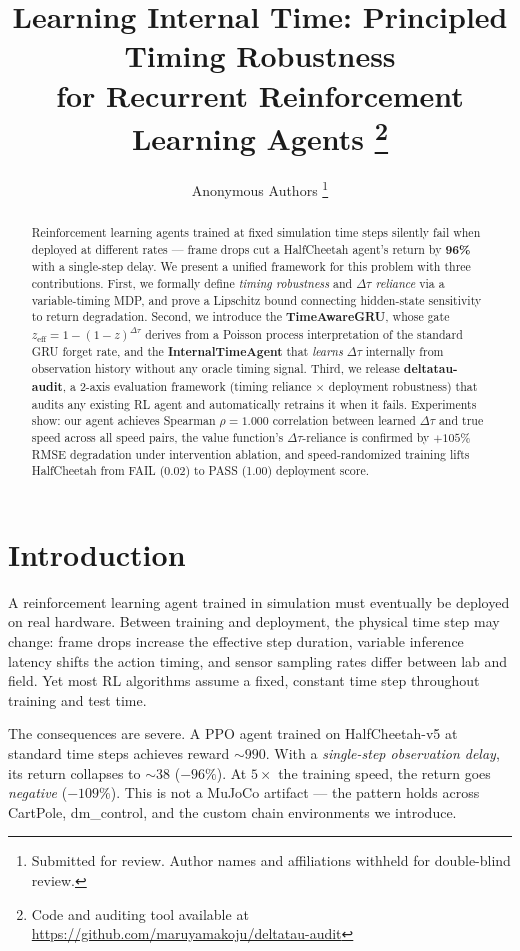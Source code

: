 \documentclass[10pt,twocolumn]{article}
\title{\textbf{Learning Internal Time: Principled Timing Robustness\\
for Recurrent Reinforcement Learning Agents}%
\thanks{Code and auditing tool available at \url{https://github.com/maruyamakoju/deltatau-audit}}}
\author{
  Anonymous Authors%
  \footnote{Submitted for review. Author names and affiliations withheld for double-blind review.}
}
\date{}
\newcommand{\deltatau}{\Delta\tau}
\newcommand{\dteff}{z_\text{eff}}
\theoremstyle{plain}
\theoremstyle{definition}
\begin{document}
\maketitle

\begin{abstract}
Reinforcement learning agents trained at fixed simulation time steps
silently fail when deployed at different rates --- frame drops cut
a HalfCheetah agent's return by \textbf{96\%} with a single-step delay.
We present a unified framework for this problem with three contributions.
First, we formally define \emph{timing robustness} and \emph{$\deltatau$ reliance}
via a variable-timing MDP, and prove a Lipschitz bound connecting hidden-state
sensitivity to return degradation.
Second, we introduce the \textbf{TimeAwareGRU}, whose gate
$\dteff = 1-(1-z)^{\deltatau}$ derives from a Poisson process interpretation
of the standard GRU forget rate, and the \textbf{InternalTimeAgent} that
\emph{learns} $\deltatau$ internally from observation history without any
oracle timing signal.
Third, we release \textbf{deltatau-audit}, a 2-axis evaluation framework
(timing reliance $\times$ deployment robustness) that audits any existing RL
agent and automatically retrains it when it fails.
Experiments show: our agent achieves Spearman $\rho=1.000$ correlation between
learned $\deltatau$ and true speed across all speed pairs,
the value function's $\deltatau$-reliance is confirmed by $+105\%$ RMSE degradation
under intervention ablation, and speed-randomized training lifts HalfCheetah from
FAIL (0.02) to PASS (1.00) deployment score.
\end{abstract}

\section{Introduction}
\label{sec:intro}

A reinforcement learning agent trained in simulation must eventually be deployed on
real hardware. Between training and deployment, the physical time step may change:
frame drops increase the effective step duration, variable inference latency shifts
the action timing, and sensor sampling rates differ between lab and field.
Yet most RL algorithms assume a fixed, constant time step throughout training and
test time.

The consequences are severe. A PPO agent trained on HalfCheetah-v5 at standard
time steps achieves reward $\sim\!990$. With a \emph{single-step observation delay},
its return collapses to $\sim\!38$ ($-96\%$). At $5\times$ the training speed, the
return goes \emph{negative} ($-109\%$). This is not a MuJoCo artifact --- the
pattern holds across CartPole, dm\_control, and the custom chain environments
we introduce.
\end{document}
